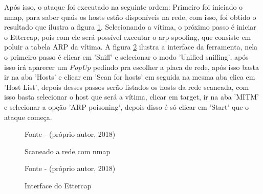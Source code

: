 Após isso, o ataque foi executado na seguinte ordem: Primeiro foi iniciado o nmap, para saber quais os hosts estão disponíveis na rede, com isso, foi obtido o resultado que ilustra a figura \ref{Fig:Scaneado a rede com nmap}. Selecionando a vítima, o próximo passo é iniciar o Ettercap, pois com ele será possível executar o arp-spoofing, que consiste em poluir a tabela ARP da vítima. A figura \ref{Fig:Interface do Ettercap} ilustra a interface da ferramenta, nela o primeiro passo é clicar em 'Sniff' e selecionar o modo 'Unified sniffing', após isso irá aparecer um \textit{PopUp} pedindo pra escolher a placa de rede, após isso basta ir na aba 'Hosts' e clicar em 'Scan for hosts' em seguida na mesma aba clica em 'Host List', depois desses passos serão listados os hosts da rede scaneada, com isso basta selecionar o host que será a vítima, clicar em target, ir na aba 'MITM' e selecionar a opção 'ARP poisoning', depois disso é só clicar em 'Start' que o ataque começa.

\begin{figure}[htbp!] \begin{center}
\caption{Scaneado a rede com nmap}
\small{Fonte - (próprio autor, 2018)}
\label{Fig:Scaneado a rede com nmap}
\end{center} \end{figure}


\begin{figure}[htbp!] \begin{center}
\caption{Interface do Ettercap}
\small{Fonte - (próprio autor, 2018)}
\label{Fig:Interface do Ettercap}
\end{center} \end{figure}

